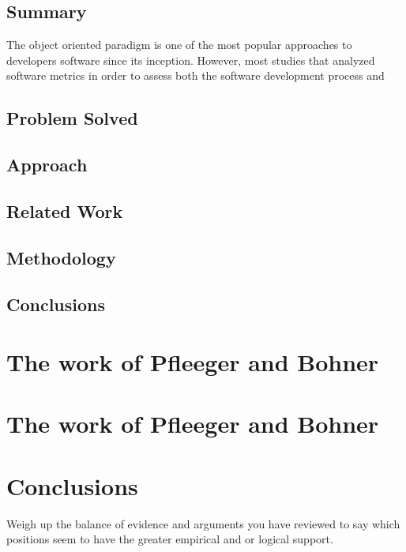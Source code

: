 \documentclass[a4paper,portrait,12pt]{article}
\begin{document}
 \subsection{Summary}
 The object oriented paradigm is one of the most popular approaches to developers
 software since its inception. However, most studies that analyzed software 
 metrics in order to assess both the software development process and 

 \subsection{Problem Solved}

 \subsection{Approach}

 \subsection{Related Work}

 \subsection{Methodology}

 \subsection{Conclusions}
 
 \section{The work of Pfleeger and Bohner}

 \section{The work of Pfleeger and Bohner}

 \section{Conclusions}

Weigh up the balance of evidence and arguments you have reviewed to say which
positions seem to have the greater empirical and or logical support.



\end{document}

